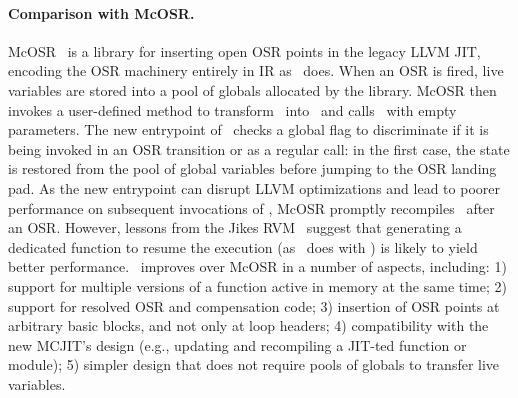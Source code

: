 \paragraph{Comparison with McOSR.}
McOSR~\cite{lameed2013modular} is a library for inserting open OSR points in the legacy LLVM JIT, encoding the OSR machinery entirely in IR as \osrkit\ does. When an OSR is fired, live variables are stored into a pool of globals allocated by the library. McOSR then invokes a user-defined method to transform \fbase\ into \fvariant\ and calls \fbase\ with empty parameters. The new entrypoint of \fbase\ checks a global flag to discriminate if it is being invoked in an OSR transition or as a regular call: in the first case, the state is restored from the pool of global variables before jumping to the OSR landing pad. As the new entrypoint can disrupt LLVM optimizations and lead to poorer performance on subsequent invocations of \fbase, McOSR promptly recompiles \fbase\ after an OSR. However, lessons from the Jikes RVM~\cite{fink2003design} suggest that generating a dedicated function to resume the execution (as  \osrkit\ does with \fosrto) is likely to yield better performance. \osrkit\ improves over McOSR in a number of aspects, including: 1) support for multiple versions of a function active in memory at the same time; 2) support for resolved OSR and compensation code; 3) insertion of OSR points at arbitrary basic blocks, and not only at loop headers; 4) compatibility with the new MCJIT's design (e.g., updating and recompiling a JIT-ted function or module); 5) simpler design that does not require pools of globals to transfer live variables.


